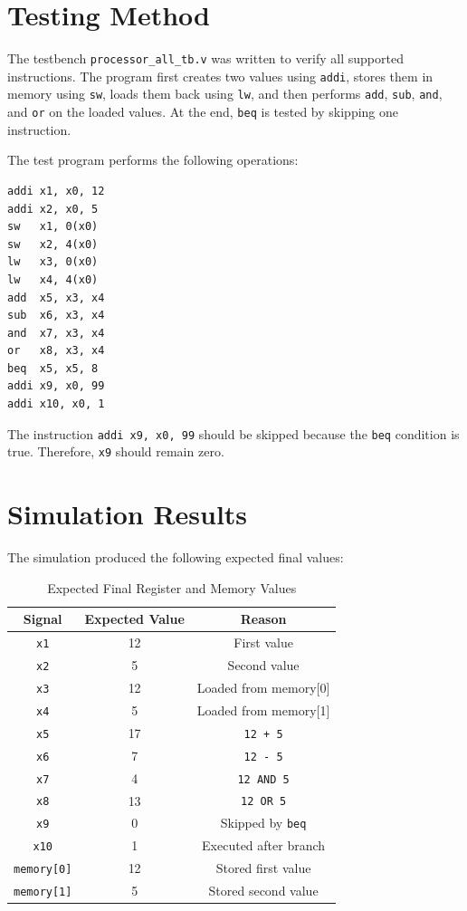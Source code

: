 \documentclass[conference]{IEEEtran}
\begin{document}
\section{Testing Method}
The testbench \texttt{processor\_all\_tb.v} was written to verify all supported instructions. The program first creates two values using \texttt{addi}, stores them in memory using \texttt{sw}, loads them back using \texttt{lw}, and then performs \texttt{add}, \texttt{sub}, \texttt{and}, and \texttt{or} on the loaded values. At the end, \texttt{beq} is tested by skipping one instruction.

The test program performs the following operations:

\begin{lstlisting}
addi x1, x0, 12
addi x2, x0, 5
sw   x1, 0(x0)
sw   x2, 4(x0)
lw   x3, 0(x0)
lw   x4, 4(x0)
add  x5, x3, x4
sub  x6, x3, x4
and  x7, x3, x4
or   x8, x3, x4
beq  x5, x5, 8
addi x9, x0, 99
addi x10, x0, 1
\end{lstlisting}

The instruction \texttt{addi x9, x0, 99} should be skipped because the \texttt{beq} condition is true. Therefore, \texttt{x9} should remain zero.

\section{Simulation Results}
The simulation produced the following expected final values:

\begin{table}[h]
\centering
\caption{Expected Final Register and Memory Values}
\label{tab:results}
\begin{tabular}{|c|c|c|}
\hline
\textbf{Signal} & \textbf{Expected Value} & \textbf{Reason} \\
\hline
\texttt{x1} & 12 & First value \\
\texttt{x2} & 5 & Second value \\
\texttt{x3} & 12 & Loaded from memory[0] \\
\texttt{x4} & 5 & Loaded from memory[1] \\
\texttt{x5} & 17 & \texttt{12 + 5} \\
\texttt{x6} & 7 & \texttt{12 - 5} \\
\texttt{x7} & 4 & \texttt{12 AND 5} \\
\texttt{x8} & 13 & \texttt{12 OR 5} \\
\texttt{x9} & 0 & Skipped by \texttt{beq} \\
\texttt{x10} & 1 & Executed after branch \\
\texttt{memory[0]} & 12 & Stored first value \\
\texttt{memory[1]} & 5 & Stored second value \\
\hline
\end{tabular}
\end{table}
\end{document}
